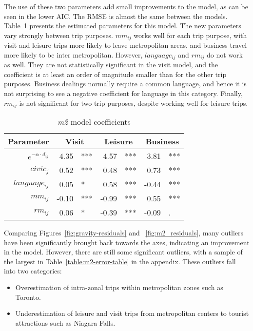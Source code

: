 The use of these two parameters add small improvements to the model, as can be seen in the lower AIC. The RMSE is almost the same between the models. Table~\ref{table:m2-coeff} presents the estimated parameters for this model. The new parameters vary strongly between trip purposes. 
$mm_{ij}$  works well for each trip purpose, with visit and leisure trips more likely to leave metropolitan areas, and business travel more likely to be inter metropolitan. However, $language_{ij}$ and $rm_{ij}$  do not work as well. They are not statistically significant in the visit model, and the coefficient is at least an order of magnitude smaller than for the other trip purposes. Business dealings normally require a common language, and hence it is not surprising to see a negative coefficient for language in this category. Finally, $rm_{ij}$  is not significant for two trip purposes, despite working well for leisure trips. 

\begin{table}[H]
\centering
\caption{\textit{m2} model coefficients}
\label{table:m2-coeff}
\begin{tabular}{@{}rrlrlrl@{}}
  \toprule
 Parameter & \multicolumn{2}{c}{Visit} & \multicolumn{2}{c}{Leisure} & \multicolumn{2}{c}{Business} \\ \midrule
  $e^{-\alpha  \cdot d_{ij}}$ 	& 4.35 & *** & 4.57 & *** & 3.81 & *** \\  
  $civic_j$ 		& 0.52 	& *** & 0.48 & *** & 0.73 & *** \\  
  $language_{ij}$ 	& 0.05 & * & 0.58 & *** & -0.44 & *** \\ 
  $mm_{ij}$  		& -0.10 & *** & -0.99 & *** & 0.55 & *** \\ 
  $rm_{ij}$			& 0.06 & * & -0.39 & *** & -0.09 & . \\  
   \bottomrule
\end{tabular}
\end{table}

Comparing Figures~\ref{fig:gravity-residuals} and ~\ref{fig:m2_residuals}, many outliers have been significantly brought back towards the axes, indicating an improvement in the model. However, there are still some significant outliers, with a sample of the largest in Table~\ref{table:m2-error-table} in the appendix. These outliers fall into two categories:
\begin{itemize}
\item Overestimation of intra-zonal trips within metropolitan zones such as Toronto.
\item Underestimation of leisure and visit trips from metropolitan centers to tourist attractions such as Niagara Falls.
\end{itemize}

